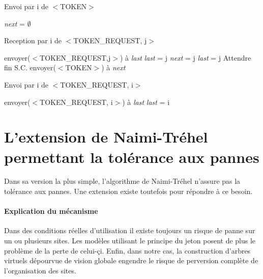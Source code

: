 \documentclass[a4paper,12pt]{article}
\newcommand{\nt}{Naimi-Tréhel }
\newcommand{\last}{\textit{last} }
\newcommand{\next}{\textit{next} }
\begin{document}
\begin{algorithm}[t]
\caption{Envoi par i de $<$TOKEN$>$}
\label{algo_naimi_trehel_envoi_token}
\begin{algorithmic}[1]
\STATE \next = $\emptyset$
\end{algorithmic}
\end{algorithm}

\begin{algorithm}[t]
\caption{Reception par i de $<$TOKEN\_REQUEST, j$>$}
\label{algo_naimi_trehel}
\begin{algorithmic}[1]

\IF {\last$_{i}$ $\ne$ i}
\STATE envoyer($<$TOKEN\_REQUEST,j$>$) à \last 
\STATE \last = j
\ELSE
\STATE \next = j
\STATE \last = j
\STATE Attendre fin S.C.
\STATE envoyer($<$TOKEN$>$) à \next
\ENDIF
\end{algorithmic}
\end{algorithm}

\begin{algorithm}[t]
\caption{Envoi par i de $<$TOKEN\_REQUEST, i$>$}
\label{algo_naimi_trehel_envoi_TK}
\begin{algorithmic}[1]
\STATE envoyer($<$TOKEN\_REQUEST, i$>$) à \last
\STATE \last = i
\end{algorithmic}
\end{algorithm}



%

\newpage

\section{L'extension de \nt permettant la tolérance aux pannes}

Dans sa version la plus simple, l'algorithme de \nt n'assure pas la tolérance aux pannes. Une extension existe toutefois pour répondre à ce besoin.

\paragraph{Explication du mécanisme}

Dans des conditions réelles d'utilisation il existe toujours un risque de panne sur un ou plusieurs sites. Les modèles utilisant le principe du jeton posent de plus le problème de la perte de celui-çi. Enfin, dans notre cas, la construction d'arbres virtuels dépourvue de vision globale engendre le risque de perversion complète de l'organisation des sites.
\end{document}
